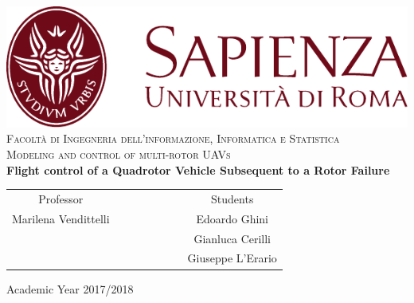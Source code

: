 \begin{titlepage}
\begin{center}
	\includegraphics[scale=0.8]{Images/SapienzaLogo} \\
	\vspace{3em}
	{\large \textsc{Facoltà di  Ingegneria dell'informazione, Informatica e Statistica}} \\
	\vspace{2em}
	{\large \textsc{Modeling and control of multi-rotor UAVs }} \\
	\doublespacing
	\vspace{5em}
	{\Large \textbf{Flight control of a Quadrotor Vehicle Subsequent to a Rotor Failure}}
\end{center}

\vskip 2cm
\begin{center}
\begin{tabular}{c c c c c c c c}
	Professor & & & & & & & Students \\[0.2cm]
	\large{Marilena Vendittelli} & & & & & & & \large{Edoardo Ghini}\\[0.4cm]
	\large{} & & & & & & & \large{Gianluca Cerilli}\\[0.4cm]
	\large{} & & & & & & & \large{Giuseppe L'Erario}\\[0.4cm]
\end{tabular}
\end{center}

\vskip 1.5cm
\begin{center}
	{\normalsize Academic Year 2017/2018}
\end{center}
\end{titlepage}

\clearpage{\pagestyle{empty}\cleardoublepage}

\vspace{5em}

\onehalfspacing

\clearpage{\pagestyle{empty}\cleardoublepage}
